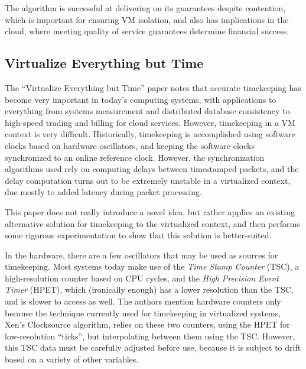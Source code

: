 \documentclass[10pt]{article}
\begin{document}
\begin{multicols*}{2}
The algorithm is successful at delivering on its guarantees despite contention,
which is important for ensuring VM isolation, and also has implications in the cloud,
where meeting quality of service guarantees determine financial success.

\subsection{Virtualize Everything but Time}
\label{sec:summaries/time}

The ``Virtualize Everything but Time'' paper \cite{ref:time} notes that accurate
timekeeping has become very important in today's computing systems, with
applications to everything from systems measurement and distributed database
consistency to high-speed trading and billing for cloud services.  However, 
timekeeping in a VM context is very difficult.  Historically, timekeeping
is accomplished using software clocks based on hardware oscillators, and
keeping the software clocks synchronized to an online
reference clock.  However, the synchronization algorithms used rely on
computing delays between timestamped packets, and the delay computation
turns out to be extremely unstable in a virtualized context, due mostly
to added latency during packet processing.

This paper does not really introduce a novel idea, but rather applies
an existing alternative solution for timekeeping to the virtualized context,
and then performs some rigorous experimentation to show that this solution
is better-suited.

In the hardware, there are a few oscillators that may be used as sources
for timekeeping.  Most systems today make use of the \emph{Time Stamp Counter}
(TSC), a high-resolution counter based on CPU cycles, and the
\emph{High Precision Event Timer} (HPET), which (ironically enough) has a
lower resolution than the TSC, and is slower to access as well.  The authors
mention hardware counters only because the technique currently used for timekeeping
in virtualized systems, Xen's Clocksource algorithm, relies on these two counters,
using the HPET for low-resolution ``ticks'', but interpolating between them using
the TSC.  However, this TSC data must be carefully adjusted before use, because
it is subject to drift based on a variety of other variables.


\end{multicols*}
\end{document}
